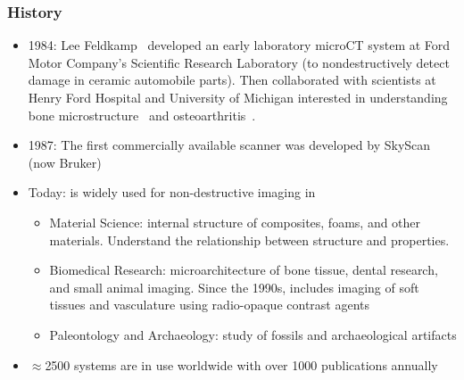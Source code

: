 \begin{frame}
  \frametitle{\uct History}
  \begin{itemize}
    \item 1984: Lee Feldkamp~\cite{Feldkamp1984} developed an early laboratory microCT system at Ford Motor Company’s Scientific Research Laboratory (to nondestructively detect damage in ceramic automobile parts).
      Then collaborated with scientists at Henry Ford Hospital and University of Michigan interested in understanding bone microstructure~\cite{Feldkamp1989} and osteoarthritis~\cite{Layton1988}.
    \item 1987: The first commercially available \uct scanner was developed by SkyScan (now Bruker)
    \item Today: \uct is widely used for non-destructive imaging in
      \begin{itemize}
        \item Material Science: internal structure of composites, foams, and other materials.
          Understand the relationship between structure and properties.
        \item Biomedical Research: microarchitecture of bone tissue, dental research, and small animal imaging. Since the 1990s, \uct includes imaging of soft tissues and vasculature using radio-opaque contrast agents
        \item Paleontology and Archaeology: study of fossils and archaeological artifacts
      \end{itemize}
    \item \(\approx\)\num{2500} \uct systems are in use worldwide with over \num{1000} publications annually
  \end{itemize}
\end{frame}

